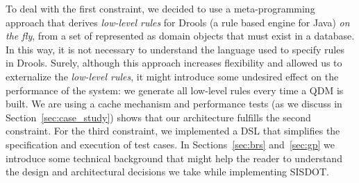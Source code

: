 To deal with the first constraint, we decided to use a meta-programming approach that derives 
\emph{low-level rules} for Drools (a rule based engine for Java) \emph{on the fly}, from a set of \callers represented 
as domain objects that must exist in a database. In this way, it is not necessary to understand 
the language used to specify rules in Drools. Surely, although this approach increases flexibility and  
allowed us to externalize the \emph{low-level rules}, it might introduce some undesired effect on 
the performance of the system: we generate all low-level rules every time a QDM is built. We are using 
a cache mechanism and performance tests (as we discuss in Section~\ref{sec:case_study}) 
shows that our architecture fulfills the second constraint. For the third constraint, we implemented a DSL that simplifies the specification and 
execution of test cases. In Sections~\ref{sec:brs} and~\ref{sec:gp} 
we introduce some technical background that might help the reader to understand 
the design and architectural decisions we take while implementing SISDOT.  
 



